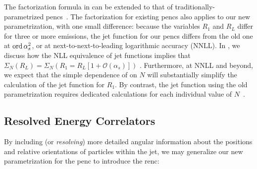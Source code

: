 The factorization formula in  can be extended to that of traditionally-parametrized \glspl{penc}~\cite{Chen:2020vvp}.
%
The factorization for existing \glspl{penc} also applies to our new parametrization, with one small difference:
%
because the variables $R_1$ and $R_L$ differ for three or more emissions, the jet function for our \glspl{penc} differs from the old one at $\operatorname{ord}{\alpha_s^2}$, or at next-to-next-to-leading logarithmic accuracy (NNLL).
%
In , we discuss how the NLL equivalence of jet functions implies that $
    \Sigma_N
    (R_L)
    =
    \Sigma_N(
    R_1 = R_L[
        1
        +
        \mathcal{O}
        (
        \alpha_s
        )
    ]
    )
$%
.
%
Furthermore, at NNLL and beyond, we expect that the simple dependence of  on $N$ will substantially simplify the calculation of the jet function for $R_1$.
%
By contrast, the jet function using the old parametrization requires dedicated calculations for each individual value of $N$~\cite{Dixon:2019uzg,Chen:2023zlx}.









\subsection{Resolved Energy Correlators}
\label{sec:enc-resolved}

By including (or \emph{resolving}) more detailed angular information about the positions and relative orientations of particles within the jet, we may generalize our new parametrization for the \gls{penc} to introduce the \gls{renc}:


